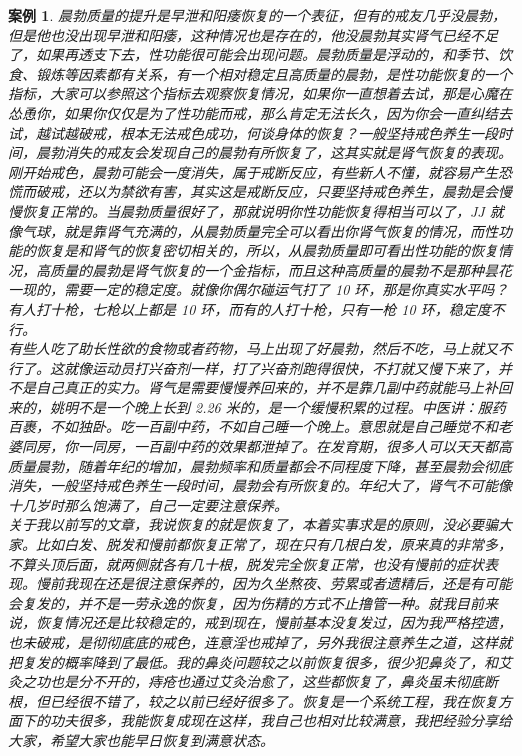 \documentclass{ctexart}
\newtheorem{case}{案例}
\begin{document}
\begin{case}
    晨勃质量的提升是早泄和阳痿恢复的一个表征，但有的戒友几乎没晨勃，但是他也没出现早泄和阳痿，这种情况也是存在的，他没晨勃其实肾气已经不足了，如果再透支下去，性功能很可能会出现问题。晨勃质量是浮动的，和季节、饮食、锻炼等因素都有关系，有一个相对稳定且高质量的晨勃，是性功能恢复的一个指标，大家可以参照这个指标去观察恢复情况，如果你一直想着去试，那是心魔在怂恿你，如果你仅仅是为了性功能而戒，那么肯定无法长久，因为你会一直纠结去试，越试越破戒，根本无法戒色成功，何谈身体的恢复？一般坚持戒色养生一段时间，晨勃消失的戒友会发现自己的晨勃有所恢复了，这其实就是肾气恢复的表现。刚开始戒色，晨勃可能会一度消失，属于戒断反应，有些新人不懂，就容易产生恐慌而破戒，还以为禁欲有害，其实这是戒断反应，只要坚持戒色养生，晨勃是会慢慢恢复正常的。当晨勃质量很好了，那就说明你性功能恢复得相当可以了，JJ 就像气球，就是靠肾气充满的，从晨勃质量完全可以看出你肾气恢复的情况，而性功能的恢复是和肾气的恢复密切相关的，所以，从晨勃质量即可看出性功能的恢复情况，高质量的晨勃是肾气恢复的一个金指标，而且这种高质量的晨勃不是那种昙花一现的，需要一定的稳定度。就像你偶尔碰运气打了 10 环，那是你真实水平吗？有人打十枪，七枪以上都是 10 环，而有的人打十枪，只有一枪 10 环，稳定度不行。\\
    有些人吃了助长性欲的食物或者药物，马上出现了好晨勃，然后不吃，马上就又不行了。这就像运动员打兴奋剂一样，打了兴奋剂跑得很快，不打就又慢下来了，并不是自己真正的实力。肾气是需要慢慢养回来的，并不是靠几副中药就能马上补回来的，姚明不是一个晚上长到 2.26 米的，是一个缓慢积累的过程。中医讲：服药百裹，不如独卧。吃一百副中药，不如自己睡一个晚上。意思就是自己睡觉不和老婆同房，你一同房，一百副中药的效果都泄掉了。在发育期，很多人可以天天都高质量晨勃，随着年纪的增加，晨勃频率和质量都会不同程度下降，甚至晨勃会彻底消失，一般坚持戒色养生一段时间，晨勃会有所恢复的。年纪大了，肾气不可能像十几岁时那么饱满了，自己一定要注意保养。\\
    关于我以前写的文章，我说恢复的就是恢复了，本着实事求是的原则，没必要骗大家。比如白发、脱发和慢前都恢复正常了，现在只有几根白发，原来真的非常多，不算头顶后面，就两侧就各有几十根，脱发完全恢复正常，也没有慢前的症状表现。慢前我现在还是很注意保养的，因为久坐熬夜、劳累或者遗精后，还是有可能会复发的，并不是一劳永逸的恢复，因为伤精的方式不止撸管一种。就我目前来说，恢复情况还是比较稳定的，戒到现在，慢前基本没复发过，因为我严格控遗，也未破戒，是彻彻底底的戒色，连意淫也戒掉了，另外我很注意养生之道，这样就把复发的概率降到了最低。我的鼻炎问题较之以前恢复很多，很少犯鼻炎了，和艾灸之功也是分不开的，痔疮也通过艾灸治愈了，这些都恢复了，鼻炎虽未彻底断根，但已经很不错了，较之以前已经好很多了。恢复是一个系统工程，我在恢复方面下的功夫很多，我能恢复成现在这样，我自己也相对比较满意，我把经验分享给大家，希望大家也能早日恢复到满意状态。\\

\end{case}
\end{document}
